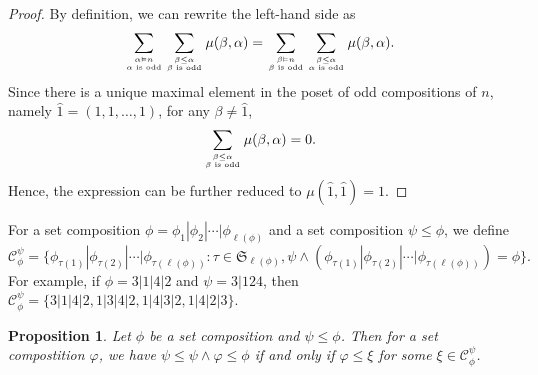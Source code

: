 \documentclass[11pt]{amsart}
\newtheorem{Proposition}[Theorem]{Proposition}
\numberwithin{equation}{section}
\begin{document}
\begin{proof}
	By definition, we can rewrite the left-hand side as
	$$\sum_{\alpha\vDash  n \atop \alpha\text{ is odd}}\sum_{\beta\leq\alpha \atop \beta\text{ is odd}}\mu(\beta,\alpha)=\sum_{\beta\vDash n \atop \beta\text{ is odd}}\sum_{\beta\leq\alpha \atop \alpha\text{ is odd}}\mu(\beta,\alpha).$$
	Since there is a unique maximal element in the poset of odd compositions of $n$, namely $\hat{1}=(1,1,\dots,1)$, for any $\beta\neq \hat{1}$,
	$$\sum_{\beta\leq\alpha \atop \beta\text{ is odd}}\mu(\beta,\alpha)=0.$$
	Hence, the expression can be further reduced to $\mu(\hat{1},\hat{1})=1$.
\end{proof}


For a set composition $\phi=\phi_1|\phi_2|\cdots|\phi_{\ell(\phi)}$ and a set composition $\psi\leq\phi$, we define $$\mathscr{C}_\phi^\psi=\{\phi_{\tau(1)}|\phi_{\tau(2)}|\cdots|\phi_{\tau(\ell(\phi))}:\tau\in\mathfrak{S}_{\ell(\phi)},\psi\land \left(\phi_{\tau(1)}|\phi_{\tau(2)}|\cdots|\phi_{\tau(\ell(\phi))}\right)=\phi\}.$$
For example, if $\phi=3|1|4|2$ and $\psi=3|124$, then $\mathscr{C}_\phi^\psi=\{3|1|4|2,1|3|4|2,1|4|3|2,1|4|2|3\}$. 


\begin{Proposition}\label{lem:int1}
	Let $\phi$ be a set composition and $\psi\leq\phi$. Then for a set compostition $\varphi$, we have $\psi\leq\psi\land\varphi\leq\phi$ if and only if $\varphi\leq\xi$ for some $\xi\in\mathscr{C}_\phi^\psi$.
\end{Proposition}
\end{document}
